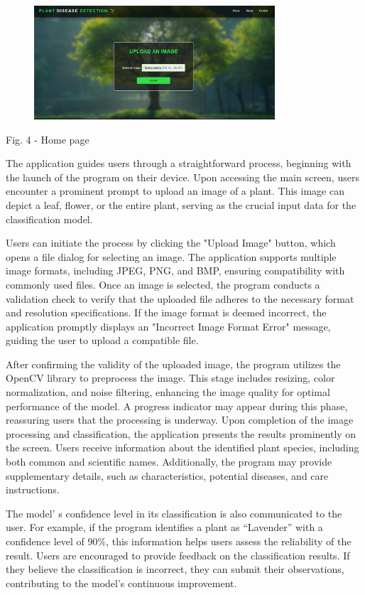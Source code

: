 {{\begin{figure}[H]
	\centering
	\includegraphics[width=0.8\textwidth]{media/ict/image33}
	\caption*{}
\end{figure}


Fig. 4 - Home page

The application guides users through a straightforward process,
beginning with the launch of the program on their device. Upon accessing
the main screen, users encounter a prominent prompt to upload an image
of a plant. This image can depict a leaf, flower, or the entire plant,
serving as the crucial input data for the classification model.

Users can initiate the process by clicking the "Upload Image" button,
which opens a file dialog for selecting an image. The application
supports multiple image formats, including JPEG, PNG, and BMP, ensuring
compatibility with commonly used files. Once an image is selected, the
program conducts a validation check to verify that the uploaded file
adheres to the necessary format and resolution specifications. If the
image format is deemed incorrect, the application promptly displays an
"Incorrect Image Format Error" message, guiding the user to upload a
compatible file.

After confirming the validity of the uploaded image, the program
utilizes the OpenCV library to preprocess the image. This stage includes
resizing, color normalization, and noise filtering, enhancing the image
quality for optimal performance of the model. A progress indicator may
appear during this phase, reassuring users that the processing is
underway. Upon completion of the image processing and classification,
the application presents the results prominently on the screen. Users
receive information about the identified plant species, including both
common and scientific names. Additionally, the program may provide
supplementary details, such as characteristics, potential diseases, and
care instructions.

The model' s confidence level in its classification is
also communicated to the user. For example, if the program identifies a
plant as ``Lavender'' with a confidence level of 90\%, this information
helps users assess the reliability of the result. Users are encouraged
to provide feedback on the classification results. If they believe the
classification is incorrect, they can submit their observations,
contributing to the model's continuous improvement.

}}
